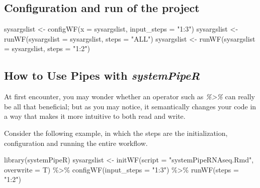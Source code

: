 \documentclass[14pt,]{article}
\newcommand{\hlstr}[1]{\textcolor[rgb]{0.251,0.627,0.251}{#1}}%
\newcommand{\hlstd}[1]{\textcolor[rgb]{0.251,0.251,0.251}{#1}}%
\newenvironment{Shaded}{\begin{myshaded}}{\end{myshaded}}
\newcommand{\SpecialCharTok}[1]{\hlstr{#1}}
\newcommand{\StringTok}[1]{\hlstr{#1}}
\newcommand{\OtherTok}[1]{{#1}}
\newcommand{\FunctionTok}[1]{\hlstd{#1}}
\newcommand{\AttributeTok}[1]{{#1}}
\newcommand{\NormalTok}[1]{\hlstd{#1}}
\begin{document}
\hypertarget{configuration-and-run-of-the-project}{%
\subsection{Configuration and run of the project}\label{configuration-and-run-of-the-project}}

\begin{Shaded}
\begin{Highlighting}[]
\NormalTok{sysargslist }\OtherTok{\textless{}{-}} \FunctionTok{configWF}\NormalTok{(}\AttributeTok{x =}\NormalTok{ sysargslist, }\AttributeTok{input\_steps =} \StringTok{"1:3"}\NormalTok{)}
\NormalTok{sysargslist }\OtherTok{\textless{}{-}} \FunctionTok{runWF}\NormalTok{(}\AttributeTok{sysargslist =}\NormalTok{ sysargslist, }\AttributeTok{steps =} \StringTok{"ALL"}\NormalTok{)}
\NormalTok{sysargslist }\OtherTok{\textless{}{-}} \FunctionTok{runWF}\NormalTok{(}\AttributeTok{sysargslist =}\NormalTok{ sysargslist, }\AttributeTok{steps =} \StringTok{"1:2"}\NormalTok{)}
\end{Highlighting}
\end{Shaded}

\hypertarget{how-to-use-pipes-with-systempiper}{%
\subsection{\texorpdfstring{How to Use Pipes with \emph{systemPipeR}}{How to Use Pipes with systemPipeR}}\label{how-to-use-pipes-with-systempiper}}

At first encounter, you may wonder whether an operator such as \emph{\%\textgreater\%} can really be all that beneficial; but as you may notice, it semantically changes your code in a way that makes it more intuitive to both read and write.

Consider the following example, in which the steps are the initialization, configuration and running the entire workflow.

\begin{Shaded}
\begin{Highlighting}[]
\FunctionTok{library}\NormalTok{(systemPipeR)}
\NormalTok{sysargslist }\OtherTok{\textless{}{-}} \FunctionTok{initWF}\NormalTok{(}\AttributeTok{script =} \StringTok{"systemPipeRNAseq.Rmd"}\NormalTok{, }\AttributeTok{overwrite =}\NormalTok{ T) }\SpecialCharTok{\%\textgreater{}\%} \FunctionTok{configWF}\NormalTok{(}\AttributeTok{input\_steps =} \StringTok{"1:3"}\NormalTok{) }\SpecialCharTok{\%\textgreater{}\%} 
    \FunctionTok{runWF}\NormalTok{(}\AttributeTok{steps =} \StringTok{"1:2"}\NormalTok{)}
\end{Highlighting}
\end{Shaded}
\end{document}
